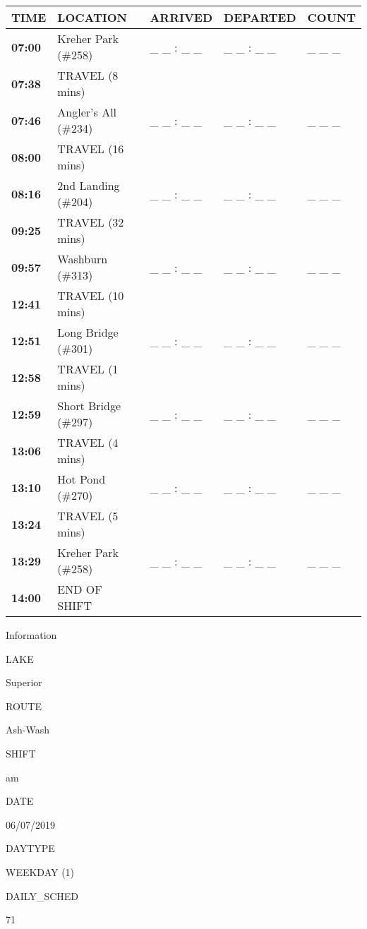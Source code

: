 \documentclass[]{article}
\begin{document}
\begin{tabular}{>{\bfseries}lllll}
\toprule
\textbf{TIME} & \textbf{LOCATION} & \textbf{ARRIVED} & \textbf{DEPARTED} & \textbf{COUNT}\\
\midrule
07:00 & Kreher Park (\#258) & \_ \_ : \_ \_ & \_ \_ : \_ \_ & \_ \_ \_\\
07:38 & TRAVEL (8 mins) &  &  & \\
07:46 & Angler's All (\#234) & \_ \_ : \_ \_ & \_ \_ : \_ \_ & \_ \_ \_\\
08:00 & TRAVEL (16 mins) &  &  & \\
08:16 & 2nd Landing (\#204) & \_ \_ : \_ \_ & \_ \_ : \_ \_ & \_ \_ \_\\
09:25 & TRAVEL (32 mins) &  &  & \\
09:57 & Washburn (\#313) & \_ \_ : \_ \_ & \_ \_ : \_ \_ & \_ \_ \_\\
12:41 & TRAVEL (10 mins) &  &  & \\
12:51 & Long Bridge (\#301) & \_ \_ : \_ \_ & \_ \_ : \_ \_ & \_ \_ \_\\
12:58 & TRAVEL (1 mins) &  &  & \\
12:59 & Short Bridge (\#297) & \_ \_ : \_ \_ & \_ \_ : \_ \_ & \_ \_ \_\\
13:06 & TRAVEL (4 mins) &  &  & \\
13:10 & Hot Pond (\#270) & \_ \_ : \_ \_ & \_ \_ : \_ \_ & \_ \_ \_\\
13:24 & TRAVEL (5 mins) &  &  & \\
13:29 & Kreher Park (\#258) & \_ \_ : \_ \_ & \_ \_ : \_ \_ & \_ \_ \_\\
14:00 & END OF SHIFT &  &  & \\
\bottomrule
\end{tabular}\newpage

Information

LAKE

Superior

ROUTE

Ash-Wash

SHIFT

am

DATE

06/07/2019

DAYTYPE

WEEKDAY (1)

DAILY\_SCHED

71

\vspace{24pt}
\end{document}
